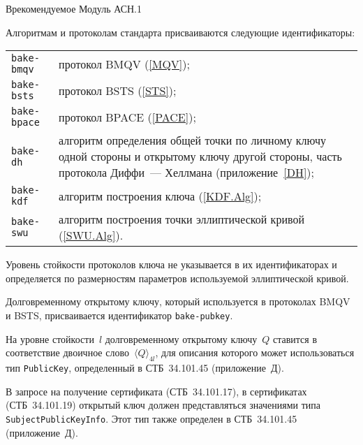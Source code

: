\begin{appendix}{В}{рекомендуемое}
{Модуль АСН.1}
\label{ASN}

\label{ASN.OIDs}

Алгоритмам и протоколам стандарта присваиваются 
следующие идентификаторы:
\begin{center}
\begin{tabular}{p{4cm}p{12cm}}
\texttt{bake-bmqv} &
протокол BMQV (\ref{MQV});\\
%
\texttt{bake-bsts} &
протокол BSTS (\ref{STS});\\
%
\texttt{bake-bpace} &
протокол BPACE (\ref{PACE});\\
%
\texttt{bake-dh} &
алгоритм определения общей точки по личному ключу 
одной стороны и открытому ключу другой стороны,
часть протокола Диффи~--- Хеллмана (приложение~\ref{DH});\\
%
\texttt{bake-kdf} &
алгоритм построения ключа (\ref{KDF.Alg});\\
%
\texttt{bake-swu} &
алгоритм построения точки эллиптической кривой (\ref{SWU.Alg}).\\
\end{tabular}
\end{center}

Уровень стойкости протоколов ключа не указывается 
в их идентификаторах и определяется по размерностям параметров 
используемой эллиптической кривой. 

Долговременному открытому ключу, 
который используется в протоколах BMQV и BSTS, 
присваивается идентификатор \texttt{bake-pubkey}.

\label{ASN.PubKey}

На уровне стойкости~$l$ долговременному открытому ключу~$Q$ 
ставится в соответствие двоичное слово~$\langle Q\rangle_{4l}$,
для описания которого может использоваться тип \texttt{PublicKey},
определенный в СТБ~34.101.45 (приложение~Д).

В запросе на получение сертификата (СТБ~34.101.17),
в сертификатах (СТБ~34.101.19)
открытый ключ должен представляться значениями типа
\texttt{SubjectPublicKeyInfo}. 
Этот тип также определен в СТБ~34.101.45
(приложение~Д).

\label{ASN.Module}




\end{appendix}
